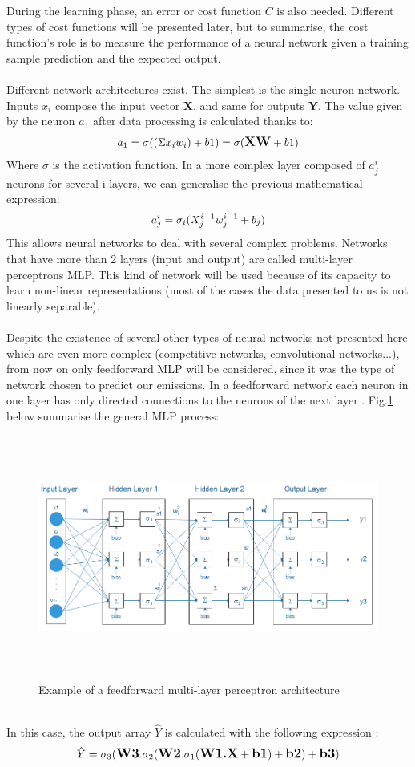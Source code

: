 \documentclass[11pt, a4paper, English]{report}
\begin{document}
\begin{appendix}
During the learning phase, an error or cost function $C$ is also needed. Different types of cost functions will be presented later, but to summarise, the cost function's role is to measure the performance of a neural network given a training sample prediction and the expected output.\\\\
Different network architectures exist.
The simplest is the single neuron network. Inputs $x_i$ compose the input vector \textbf{X}, and same for outputs \textbf{Y}. The value given by the neuron $a_1$ after data processing is calculated thanks to:
\begin{equation}
\large a_1=\sigma((\Sigma x_i w_i)+b1)=\sigma(\textbf{X}\textbf{W}+b1)
\end{equation}
Where $\sigma$ is the activation function. In a more complex layer composed of $a^i_j$ neurons for several i layers, we can generalise the previous mathematical expression: 
\begin{equation}
\large a^i_j=\sigma_i(X^{i-1}_j w^{i-1}_j+b_j)
\end{equation}
This allows neural networks to deal with several complex problems.  Networks that have more than 2 layers (input and output) are called multi-layer perceptrons MLP. This kind of network will be used because of its capacity to learn non-linear representations (most of the cases the data presented to us is not linearly separable).\\\\ Despite the existence of several other types of neural networks not presented here which are even more complex (competitive networks, convolutional networks...), from now on only feedforward MLP will be considered, since it was the type of network chosen to predict our emissions. In a feedforward network each neuron in one layer has only directed connections to the neurons of the next layer \cite{Kriesel}. Fig.\ref{arch} below summarise the general MLP process: 
\begin{figure}[h!]
    \centering
    \includegraphics[width=\textwidth, height=8cm]{s9_5.png}
    \caption{Example of a feedforward multi-layer perceptron architecture}
    \label{arch}
\end{figure}\\
In this case, the output array $\hat{Y}$ is calculated with the following expression :
$$\large \hat{Y}=\sigma_3(\textbf{W3}.\sigma_2(\textbf{W2}.\sigma_1(\textbf{W1.X}+\textbf{b1})+\textbf{b2})+\textbf{b3})$$


\end{appendix}
\end{document}
